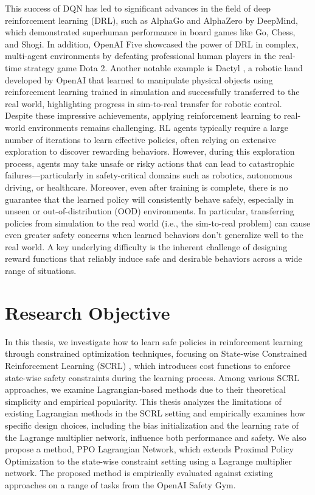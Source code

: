 This success of DQN has led to significant advances in the field of deep reinforcement learning (DRL), such as AlphaGo \cite{AlphaGo} and AlphaZero \cite{AlphaZero} by DeepMind, which demonstrated superhuman performance in board games like Go, Chess, and Shogi.
In addition, OpenAI Five \cite{Five} showcased the power of DRL in complex, multi-agent environments by defeating professional human players in the real-time strategy game Dota 2.
Another notable example is Dactyl \cite{Dactyl}, a robotic hand developed by OpenAI that learned to manipulate physical objects using reinforcement learning trained in simulation and successfully transferred to the real world, highlighting progress in sim-to-real transfer for robotic control.
Despite these impressive achievements, applying reinforcement learning to real-world environments remains challenging.
RL agents typically require a large number of iterations to learn effective policies, often relying on extensive exploration to discover rewarding behaviors.
However, during this exploration process, agents may take unsafe or risky actions that can lead to catastrophic failures—particularly in safety-critical domains such as robotics, autonomous driving, or healthcare.
Moreover, even after training is complete, there is no guarantee that the learned policy will consistently behave safely, especially in unseen or out-of-distribution (OOD) environments.
In particular, transferring policies from simulation to the real world (i.e., the sim-to-real problem) can cause even greater safety concerns when learned behaviors don’t generalize well to the real world.
A key underlying difficulty is the inherent challenge of designing reward functions that reliably induce safe and desirable behaviors across a wide range of situations.

\section{Research Objective}

In this thesis, we investigate how to learn safe policies in reinforcement learning through constrained optimization techniques, focusing on State-wise Constrained Reinforcement Learning (SCRL) \cite{SCRL-survey}, which introduces cost functions to enforce state-wise safety constraints during the learning process.
Among various SCRL approaches, we examine Lagrangian-based methods due to their theoretical simplicity and empirical popularity.
This thesis analyzes the limitations of existing Lagrangian methods in the SCRL setting and empirically examines how specific design choices, including the bias initialization and the learning rate of the Lagrange multiplier network, influence both performance and safety.
We also propose a method, PPO Lagrangian Network, which extends Proximal Policy Optimization to the state-wise constraint setting using a Lagrange multiplier network.
The proposed method is empirically evaluated against existing approaches on a range of tasks from the OpenAI Safety Gym.


